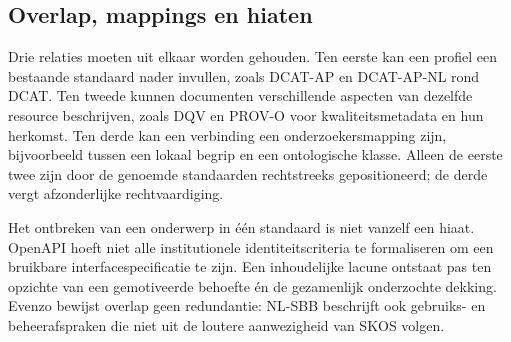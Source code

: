 \subsection{Overlap, mappings en hiaten}
Drie relaties moeten uit elkaar worden gehouden. Ten eerste kan een profiel een bestaande standaard nader invullen, zoals DCAT-AP en DCAT-AP-NL rond DCAT. Ten tweede kunnen documenten verschillende aspecten van dezelfde resource beschrijven, zoals DQV en PROV-O voor kwaliteitsmetadata en hun herkomst. Ten derde kan een verbinding een onderzoekersmapping zijn, bijvoorbeeld tussen een lokaal begrip en een ontologische klasse. Alleen de eerste twee zijn door de genoemde standaarden rechtstreeks gepositioneerd; de derde vergt afzonderlijke rechtvaardiging. \parencite{S47,S45,S16,S34,S33,S31}

Het ontbreken van een onderwerp in één standaard is niet vanzelf een hiaat. OpenAPI hoeft niet alle institutionele identiteitscriteria te formaliseren om een bruikbare interfacespecificatie te zijn. Een inhoudelijke lacune ontstaat pas ten opzichte van een gemotiveerde behoefte én de gezamenlijk onderzochte dekking. Evenzo bewijst overlap geen redundantie: NL-SBB beschrijft ook gebruiks- en beheerafspraken die niet uit de loutere aanwezigheid van SKOS volgen. \parencite{S19,S14,S31}

